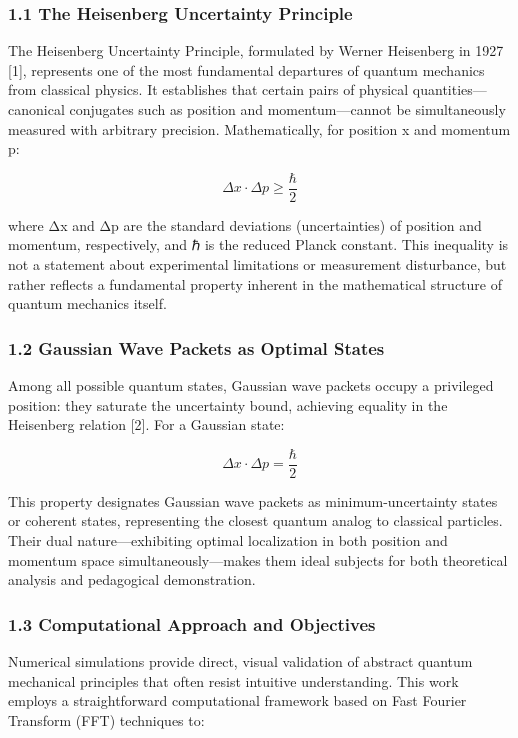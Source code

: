 \documentclass[
  11pt,
]{article}
\begin{document}
\subsubsection{1.1 The Heisenberg Uncertainty
Principle}\label{the-heisenberg-uncertainty-principle}

The Heisenberg Uncertainty Principle, formulated by Werner Heisenberg in
1927 {[}1{]}, represents one of the most fundamental departures of
quantum mechanics from classical physics. It establishes that certain
pairs of physical quantities---canonical conjugates such as position and
momentum---cannot be simultaneously measured with arbitrary precision.
Mathematically, for position x and momentum p:

\[\Delta x \cdot \Delta p \geq \frac{\hbar}{2}\]

where Δx and Δp are the standard deviations (uncertainties) of position
and momentum, respectively, and ℏ is the reduced Planck constant. This
inequality is not a statement about experimental limitations or
measurement disturbance, but rather reflects a fundamental property
inherent in the mathematical structure of quantum mechanics itself.

\subsubsection{1.2 Gaussian Wave Packets as Optimal
States}\label{gaussian-wave-packets-as-optimal-states}

Among all possible quantum states, Gaussian wave packets occupy a
privileged position: they saturate the uncertainty bound, achieving
equality in the Heisenberg relation {[}2{]}. For a Gaussian state:

\[\Delta x \cdot \Delta p = \frac{\hbar}{2}\]

This property designates Gaussian wave packets as minimum-uncertainty
states or coherent states, representing the closest quantum analog to
classical particles. Their dual nature---exhibiting optimal localization
in both position and momentum space simultaneously---makes them ideal
subjects for both theoretical analysis and pedagogical demonstration.

\subsubsection{1.3 Computational Approach and
Objectives}\label{computational-approach-and-objectives}

Numerical simulations provide direct, visual validation of abstract
quantum mechanical principles that often resist intuitive understanding.
This work employs a straightforward computational framework based on
Fast Fourier Transform (FFT) techniques to:
\end{document}
